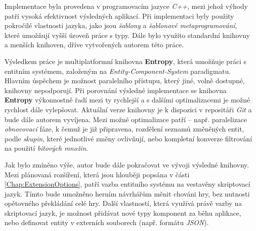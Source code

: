 Implementace byla provedena v programovacím jazyce \emph{C++}, mezi jehož výhody patří vysoká efektivnost výsledných aplikací. Při implementaci byly použity pokročilé vlastnosti jazyka, jako jsou \emph{šablony} a \emph{šablonové metaprogramování}, které umožňují vyšší úroveň práce s typy. Dále bylo využito standardní knihovny a menších knihoven, dříve vytvořených autorem této práce. 



Výsledkem práce je multiplatformní knihovna \textbf{Entropy}, která umožňuje práci s entitním systémem, založeným na \emph{Entity-Component-System} paradigmatu. Hlavním úspěchem je možnost paralelního přístupu, který jiné, volně dostupné, knihovny nepodporují. Při porovnání výsledné implementace se knihovna \textbf{Entropy} výkonnostně řadí mezi ty rychlejší a s dalšími optimalizacemi je možné rychlost dále vylepšovat. Aktuální verze knihovny je k dispozici v repositáři \emph{Git} \cite{EntropyGit} a bude dále autorem vyvíjena. Mezi možné optimalizace patří -- např. paralelizace \emph{obnovovací} fáze, k čemuž je již připravena, rozdělení seznamů změněných entit, podle \emph{skupin}, které jednotlivé změny ovlivňují, nebo kompletní konverze filtrování na použití \emph{bitových množin}.

Jak bylo zmíněno výše, autor bude dále pokračovat ve vývoji výsledné knihovny. Mezi plánovaná rozšíření, která jsou hlouběji popsána v části \ref{Chap:ExtensionOptions}, patří vazba entitního systému na vestavěny skriptovací jazyk. Tímto bude umožněno herním návrhářům měnit chováni hry, bez nutnosti opětovného překládání celé hry. Další vlastností, která využívá právě vazby na skriptovací jazyk, je možnost přidávat nové typy komponent za běhu aplikace, nebo definovat entity v externích souborech (např. formátu \emph{JSON}). 


